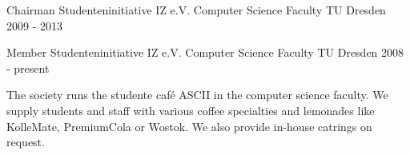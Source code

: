 \begin{cventries}

  \cventry
    {Chairman Studenteninitiative IZ e.V.}
    {Computer Science Faculty}
    {TU Dresden}
    {2009 - 2013}
    { }

  \cventry
    {Member Studenteninitiative IZ e.V.}
    {Computer Science Faculty}
    {TU Dresden}
    {2008 - present}
    {
      \begin{cvitems}
      \item[] {The society runs the studente caf\'{e} ASCII in the computer science
      faculty. We supply students and staff with various coffee specialties and
      lemonades like KolleMate, PremiumCola or Wostok. We also provide in-house
      catrings on request.}
      \end{cvitems}
    }

\end{cventries}
